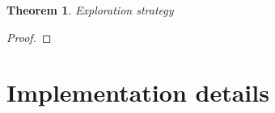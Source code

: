 \documentclass[11pt]{article}
\newtheorem{theorem}{Theorem}
\begin{document}
      \begin{theorem}
	Exploration strategy
\end{theorem}
\begin{proof}
	
\end{proof}
\section{Implementation details}
\end{document}
